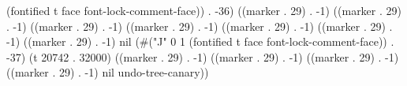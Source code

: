 (fontified t face font-lock-comment-face)) . -36) ((marker . 29) . -1) ((marker . 29) . -1) ((marker . 29) . -1) ((marker . 29) . -1) ((marker . 29) . -1) ((marker . 29) . -1) ((marker . 29) . -1) nil (#("J" 0 1 (fontified t face font-lock-comment-face)) . -37) (t 20742 . 32000) ((marker . 29) . -1) ((marker . 29) . -1) ((marker . 29) . -1) ((marker . 29) . -1) nil undo-tree-canary))
